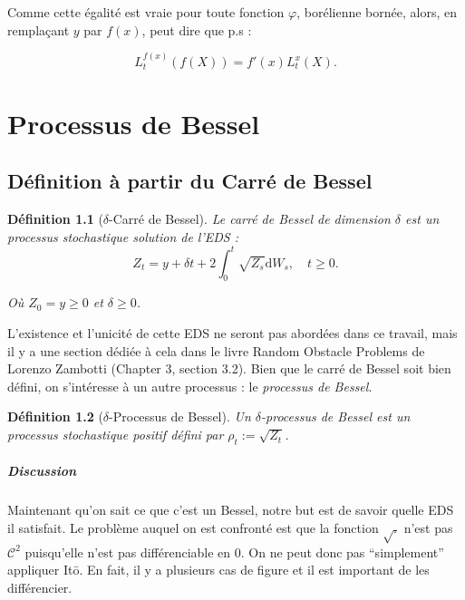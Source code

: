 \documentclass[openany]{book}
\makeatletter
\newcommand{\1}{\mathbbm{1}}
\renewcommand{\d}{\mathrm{d}}
\renewenvironment{proof}[1][\textbf{\textit{Démonstration}}]{%
  \par\pushQED{\qed}%
  \normalfont\topsep6\p@\@plus6\p@\relax
  \trivlist\item[\hskip\labelsep
    #1\@addpunct{.}]\ignorespaces
}{%
  \popQED\endtrivlist\@endpefalse
}
\theoremstyle{thmfont}
\theoremstyle{deffont}
\newtheorem{definition}[definition]{Définition}
\theoremstyle{thmfont}
\theoremstyle{deffont}
\makeatother
\begin{document}
\begin{proof}
Comme cette égalité est vraie pour toute fonction $\varphi$, borélienne bornée, alors, en remplaçant $y$ par $f(x)$, peut dire que p.s :

$$L_t^{f(x)}(f(X)) =  f'(x) L_t^{x}(X).$$
\end{proof}


\chapter{Processus de Bessel}

\section{Définition à partir du Carré de Bessel} 
\begin{definition}[$\delta$-Carré de Bessel] Le \textit{carré de Bessel} de dimension $\delta$ est un processus stochastique solution de l'EDS :
  \begin{equation}
    Z_t = y + \delta t + 2 \int_0^t \sqrt{Z_s} \d W_s, \quad t\geq0.
    \label{eq:EDSCarreBessel}
  \end{equation}

  Où $Z_0 = y \geq 0$ et $\delta \geq 0$.
\end{definition}

L'existence et l'unicité de cette EDS ne seront pas abordées dans ce travail, mais il y a une section dédiée à cela dans le livre Random Obstacle Problems de Lorenzo Zambotti (Chapter 3, section 3.2).
Bien que le carré de Bessel soit bien défini, on s’intéresse à un autre processus : le \textit{processus de Bessel}.

\begin{definition}[$\delta$-Processus de Bessel] Un $\delta$-\textit{processus de Bessel} est un processus stochastique positif défini par $\rho_t := \sqrt{Z_t}$.
\end{definition}

\paragraph{Discussion}
Maintenant qu'on sait ce que c'est un Bessel, notre but est de savoir quelle EDS il satisfait. Le problème auquel on est confronté est que la fonction $\sqrt{.}$ n'est pas $\mathcal C^2$ puisqu'elle n'est pas différenciable en 0. On ne peut donc pas ``simplement'' appliquer Itō. En fait, il y a plusieurs cas de figure et il est important de les différencier.
\end{document}

